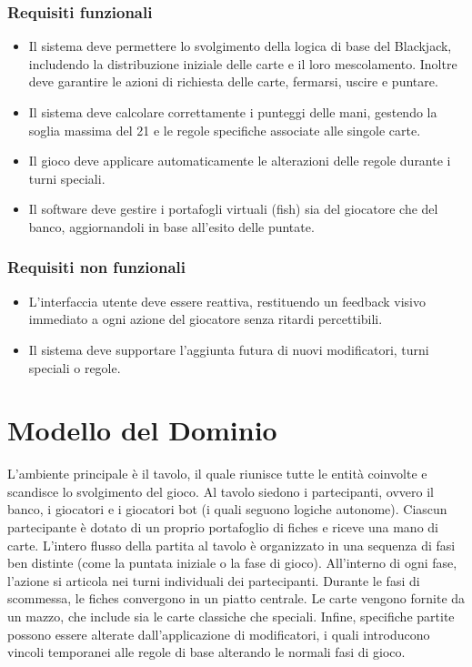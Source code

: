 \documentclass[a4paper,12pt]{report}
\begin{document}
\subsubsection{Requisiti funzionali}
\begin{itemize}
	\item Il sistema deve permettere lo svolgimento della logica di base del Blackjack, includendo la distribuzione iniziale delle carte e il loro mescolamento. Inoltre deve garantire le azioni di richiesta delle carte, fermarsi, uscire e puntare.
	\item Il sistema deve calcolare correttamente i punteggi delle mani, gestendo la soglia massima del 21 e le regole specifiche associate alle singole carte.
	\item Il gioco deve applicare automaticamente le alterazioni delle regole durante i turni speciali.
	\item Il software deve gestire i portafogli virtuali (fish) sia del giocatore che del banco, aggiornandoli in base all'esito delle puntate.
\end{itemize}

\subsubsection{Requisiti non funzionali}
\begin{itemize}
	\item L'interfaccia utente deve essere reattiva, restituendo un feedback visivo immediato a ogni azione del giocatore senza ritardi percettibili.
	\item Il sistema deve supportare l'aggiunta futura di nuovi modificatori, turni speciali o regole. 
\end{itemize}


\section{Modello del Dominio}

L'ambiente principale è il tavolo, il quale riunisce tutte le entità coinvolte e scandisce lo svolgimento del gioco. Al tavolo siedono i partecipanti, ovvero il banco, i giocatori e i giocatori bot (i quali seguono logiche autonome). Ciascun partecipante è dotato di un proprio portafoglio di fiches e riceve una mano di carte.
L'intero flusso della partita al tavolo è organizzato in una sequenza di fasi ben distinte (come la puntata iniziale o la fase di gioco). 
All'interno di ogni fase, l'azione si articola nei turni individuali dei partecipanti. Durante le fasi di scommessa, le fiches convergono in un piatto centrale. Le carte vengono fornite da un mazzo, che include sia le carte classiche che speciali.
Infine, specifiche partite possono essere alterate dall'applicazione di modificatori, i quali introducono vincoli temporanei alle regole di base alterando le normali fasi di gioco.
\end{document}
